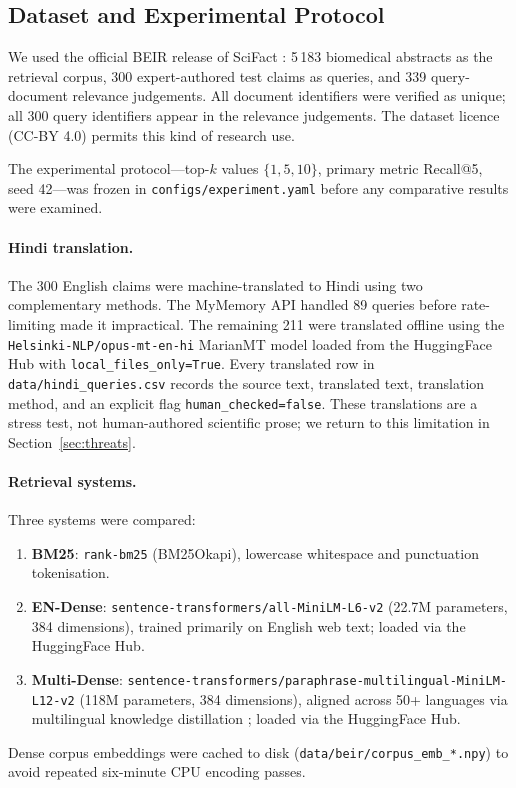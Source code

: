 \documentclass[acmsmall,screen,review]{acmart}
\begin{document}
\subsection{Dataset and Experimental Protocol}
\label{sec:data-protocol}

We used the official BEIR release of SciFact
\citep{thakur2021beir,wadden2020scifact}: 5\,183 biomedical abstracts as
the retrieval corpus, 300 expert-authored test claims as queries, and 339
query-document relevance judgements.  All document identifiers were
verified as unique; all 300 query identifiers appear in the relevance
judgements.  The dataset licence (CC-BY 4.0) permits this kind of
research use.

The experimental protocol---top-$k$ values $\{1, 5, 10\}$, primary
metric Recall@5, seed 42---was frozen in
\texttt{configs/experiment.yaml} before any comparative results were
examined.

\paragraph{Hindi translation.}
The 300 English claims were machine-translated to Hindi using two
complementary methods.  The MyMemory API handled 89 queries before
rate-limiting made it impractical.  The remaining 211 were translated
offline using the \texttt{Helsinki-NLP/opus-mt-en-hi} MarianMT model
loaded from the HuggingFace Hub with \texttt{local\_files\_only=True}.
Every translated row in \texttt{data/hindi\_queries.csv} records the
source text, translated text, translation method, and an explicit flag
\texttt{human\_checked=false}.  These translations are a stress test, not
human-authored scientific prose; we return to this limitation in
Section~\ref{sec:threats}.

\paragraph{Retrieval systems.}
Three systems were compared:
\begin{enumerate}
  \item \textbf{BM25}: \texttt{rank-bm25} (BM25Okapi), lowercase
        whitespace and punctuation tokenisation.
  \item \textbf{EN-Dense}: \texttt{sentence-transformers/all-MiniLM-L6-v2}
        (22.7M parameters, 384 dimensions), trained primarily on English
        web text; loaded via the HuggingFace Hub.
  \item \textbf{Multi-Dense}:
        \texttt{sentence-transformers/paraphrase-multilingual-MiniLM-L12-v2}
        (118M parameters, 384 dimensions), aligned across 50+ languages
        via multilingual knowledge distillation
        \citep{reimers2020multilingual}; loaded via the HuggingFace Hub.
\end{enumerate}
Dense corpus embeddings were cached to disk
(\texttt{data/beir/corpus\_emb\_*.npy}) to avoid repeated six-minute
CPU encoding passes.
\end{document}
